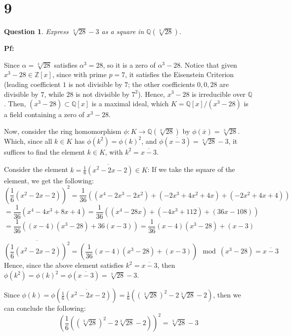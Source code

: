 \documentclass{article}
\newtheorem{question}{Question}
\begin{document}
\break

\section*{9}
\begin{myBox}[]{}
    \begin{question}
        Express $\sqrt[3]{28}-3$ as a square in $\mathbb{Q}(\sqrt[3]{28})$.
    \end{question}
\end{myBox}

\textbf{Pf:}

Since $\alpha=\sqrt[3]{28}$ satisfies $\alpha^3=28$, so it is a zero of $\alpha^3-28$.
Notice that given $x^3-28\in\mathbb{Z}[x]$, since with prime $p=7$, it satisfies the Eisenstein Criterion 
(leading coefficient $1$ is not divisible by $7$; the other coefficients $0,0,28$ are divisible by $7$, while $28$ is not divisible by $7^2$).
Hence, $x^3-28$ is irreducible over $\mathbb{Q}$. Then, $(x^3-28)\subset \mathbb{Q}[x]$ is a maximal ideal, which $K=\mathbb{Q}[x]/(x^3-28)$
is a field containing a zero of $x^3-28$.

\hfil

Now, consider the ring homomorphism $\phi:K\rightarrow\mathbb{Q}(\sqrt[3]{28})$ by $\phi(\overline{x})=\sqrt[3]{28}$. Which, since all $k\in K$ has $\phi(k^2)=\phi(k)^2$,
and $\phi(\overline{x-3})=\sqrt[3]{28}-3$, it suffices to find the element $k\in K$, with $k^2=\overline{x-3}$.

\hfil

Consider the element $k=\overline{\frac{1}{6}(x^2-2x-2)}\in K$: If we take the square of the element, we get the following:
$$\left(\frac{1}{6}(x^2-2x-2)\right)^2=\frac{1}{36}((x^4-2x^3-2x^2)+(-2x^3+4x^2+4x)+(-2x^2+4x+4))$$
$$=\frac{1}{36}(x^4-4x^3+8x+4)=\frac{1}{36}((x^4-28x)+(-4x^3+112)+(36x-108))$$
$$=\frac{1}{36}((x-4)(x^3-28)+36(x-3)) = \frac{1}{36}(x-4)(x^3-28)+(x-3)$$

$$\overline{\left(\frac{1}{6}(x^2-2x-2)\right)^2}=\left(\frac{1}{36}(x-4)(x^3-28)+(x-3)\right)\mod (x^3-28) = \overline{x-3}$$
Hence, since the above element satisfies $k^2=\overline{x-3}$, then $\phi(k^2)=\phi(k)^2=\phi(\overline{x-3})=\sqrt[3]{28}-3$.

Since $\phi(k)=\phi(\overline{\frac{1}{6}(x^2-2x-2)})=\frac{1}{6}((\sqrt[3]{28})^2-2\sqrt[3]{28}-2)$, then we can conclude the following:
$$\left(\frac{1}{6}((\sqrt[3]{28})^2-2\sqrt[3]{28}-2)\right)^2=\sqrt[3]{28}-3$$
\end{document}
